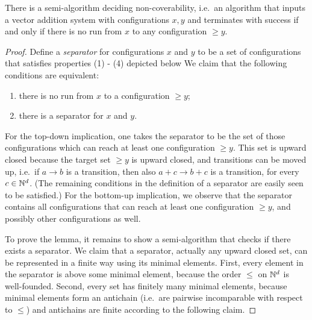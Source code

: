 \begin{lemma}\label{lem:}
There is a semi-algorithm deciding non-coverability, i.e.~an algorithm that inputs a vector addition system with configurations $x,y$ and terminates with success if and only if there is no run from $x$ to any configuration $\ge y$.
\end{lemma}
\begin{proof} 
Define a \emph{separator} for configurations $x$ and $y$ to be a set of  configurations that satisfies properties (1) - (4) depicted below
We claim that the following conditions are equivalent:
\begin{enumerate}
	\item there is no run from $x$ to a configuration $\ge y$;
	\item there is a separator for $x$ and $y$.
\end{enumerate}
For the top-down  implication, one takes the separator to be the set of those configurations which can reach at least one configuration $\ge y$. This set is upward closed because the target set $\ge y$ is upward closed, and  transitions can be moved up, i.e.~if $a \to b$ is a transition, then also $a+c \to b+c$ is a transition, for every $c \in \mathbb{N}^d$.  (The remaining conditions in the definition of a separator are easily seen to be satisfied.)  For the bottom-up implication,  we observe that the separator contains all configurations that can reach at least one  configuration $\ge y$, and possibly other configurations as well.

To prove the lemma, it  remains to show a semi-algorithm that checks if there exists a separator. We claim that a separator, actually any upward closed set, can be represented in a finite way using its minimal elements. First, every element in the separator is above some minimal element, because the order $\le$ on $\mathbb{N}^d$ is well-founded. Second, every set has finitely many minimal elements, because  minimal elements form an antichain (i.e.~are pairwise incomparable with respect to $\le$) and antichains are finite according to the following claim.


\end{proof}
